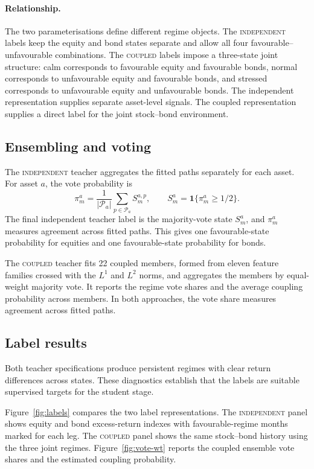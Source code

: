 \documentclass[10pt]{article}
\newcommand{\Path}{\mathcal{P}}
\newcommand{\Acoup}{\textsc{coupled}}
\newcommand{\Bindep}{\textsc{independent}}
\begin{document}
\paragraph{Relationship.}
The two parameterisations define different regime objects. The \Bindep{} labels keep the
equity and bond states separate and allow all four favourable--unfavourable combinations. The
\Acoup{} labels impose a three-state joint structure: calm corresponds to favourable equity
and favourable bonds, normal corresponds to unfavourable equity and favourable bonds, and
stressed corresponds to unfavourable equity and unfavourable bonds. The independent
representation supplies separate asset-level signals. The coupled representation supplies a
direct label for the joint stock--bond environment.

\subsection{Ensembling and voting}

The \Bindep{} teacher aggregates the fitted paths separately for each asset. For asset \(a\),
the vote probability is
\begin{equation}
\pi^a_m=\frac{1}{|\Path_a|}\sum_{p\in\Path_a}S^{a,p}_m,
\qquad
S^a_m=\mathbf{1}\{\pi^a_m\ge 1/2\}.
\label{eq:independent-vote}
\end{equation}
The final independent teacher label is the majority-vote state \(S^a_m\), and \(\pi^a_m\)
measures agreement across fitted paths. This gives one favourable-state probability for
equities and one favourable-state probability for bonds.

The \Acoup{} teacher fits 22 coupled members, formed from eleven feature families crossed
with the \(L^1\) and \(L^2\) norms, and aggregates the members by equal-weight majority vote.
It reports the regime vote shares and the average coupling probability across members. In
both approaches, the vote share measures agreement across fitted paths.

\subsection{Label results}
\label{sec:teacher-results}

Both teacher specifications produce persistent regimes with clear return differences across
states. These diagnostics establish that the labels are suitable supervised targets for the
student stage.

Figure~\ref{fig:labels} compares the two label representations. The \Bindep{} panel shows
equity and bond excess-return indexes with favourable-regime months marked for each leg. The
\Acoup{} panel shows the same stock--bond history using the three joint regimes.
Figure~\ref{fig:vote-wt} reports the coupled ensemble vote shares and the estimated coupling
probability.
\end{document}
